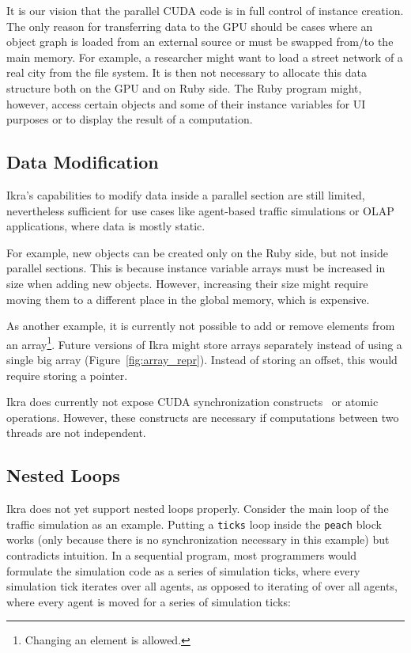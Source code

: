 \documentclass[preprint]{sigplanconf}
\begin{document}
It is our vision that the parallel CUDA code is in full control of instance creation. The only reason for transferring data to the GPU should be cases where an object graph is loaded from an external source or must be swapped from/to the main memory. For example, a researcher might want to load a street network of a real city from the file system. It is then not necessary to allocate this data structure both on the GPU and on Ruby side. The Ruby program might, however, access certain objects and some of their instance variables for UI purposes or to display the result of a computation.

\subsection{Data Modification}
\label{sec:gen_new_obj}
Ikra's capabilities to modify data inside a parallel section are still limited, nevertheless sufficient for use cases like agent-based traffic simulations or OLAP applications, where data is mostly static.

For example, new objects can be created only on the Ruby side, but not inside parallel sections. This is because instance variable arrays must be increased in size when adding new objects. However, increasing their size might require moving them to a different place in the global memory, which is expensive.

As another example, it is currently not possible to add or remove elements from an array\footnote{Changing an element is allowed.}. Future versions of Ikra might store arrays separately instead of using a single big array (Figure~\ref{fig:array_repr}). Instead of storing an offset, this would require storing a pointer.

Ikra does currently not expose CUDA synchronization constructs~\cite{gpusync} or atomic operations. However, these constructs are necessary if computations between two threads are not independent.

\balance

\subsection{Nested Loops}
\label{sec:nested_loops}
Ikra does not yet support nested loops properly. Consider the main loop of the traffic simulation as an example. Putting a \texttt{ticks} loop inside the \texttt{peach} block works (only because there is no synchronization necessary in this example) but contradicts intuition. In a sequential program, most programmers would formulate the simulation code as a series of simulation ticks, where every simulation tick iterates over all agents, as opposed to iterating of over all agents, where every agent is moved for a series of simulation ticks:
\end{document}
